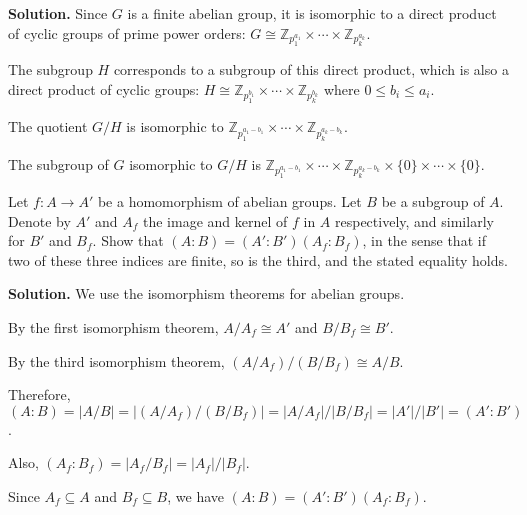 \noindent\textbf{Solution.} Since $G$ is a finite abelian group, it is isomorphic to a direct product of cyclic groups of prime power orders: $G \cong \mathbb{Z}_{p_1^{a_1}} \times \cdots \times \mathbb{Z}_{p_k^{a_k}}$.

The subgroup $H$ corresponds to a subgroup of this direct product, which is also a direct product of cyclic groups: $H \cong \mathbb{Z}_{p_1^{b_1}} \times \cdots \times \mathbb{Z}_{p_k^{b_k}}$ where $0 \leq b_i \leq a_i$.

The quotient $G/H$ is isomorphic to $\mathbb{Z}_{p_1^{a_1-b_1}} \times \cdots \times \mathbb{Z}_{p_k^{a_k-b_k}}$.

The subgroup of $G$ isomorphic to $G/H$ is $\mathbb{Z}_{p_1^{a_1-b_1}} \times \cdots \times \mathbb{Z}_{p_k^{a_k-b_k}} \times \{0\} \times \cdots \times \{0\}$.

\begin{problembox}
Let $f: A \to A'$ be a homomorphism of abelian groups. Let $B$ be a subgroup of $A$. Denote by $A'$ and $A_f$ the image and kernel of $f$ in $A$ respectively, and similarly for $B'$ and $B_f$. Show that $(A : B) = (A' : B')(A_f : B_f)$, in the sense that if two of these three indices are finite, so is the third, and the stated equality holds.
\end{problembox}

\noindent\textbf{Solution.} We use the isomorphism theorems for abelian groups.

By the first isomorphism theorem, $A/A_f \cong A'$ and $B/B_f \cong B'$.

By the third isomorphism theorem, $(A/A_f)/(B/B_f) \cong A/B$.

Therefore, $(A : B) = |A/B| = |(A/A_f)/(B/B_f)| = |A/A_f|/|B/B_f| = |A'|/|B'| = (A' : B')$.

Also, $(A_f : B_f) = |A_f/B_f| = |A_f|/|B_f|$.

Since $A_f \subseteq A$ and $B_f \subseteq B$, we have $(A : B) = (A' : B')(A_f : B_f)$.

